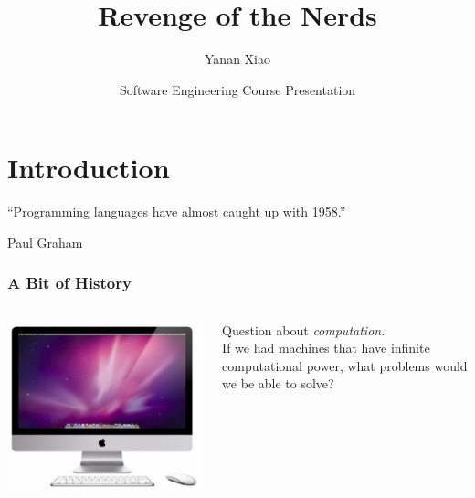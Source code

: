 \documentclass[12pt,hyperref=true,mathserif]{beamer}
\begin{document}
\title{Revenge of the Nerds}
\author{Yanan Xiao}
\date[CIS502 Presentation]{Software Engineering Course Presentation}

\begin{frame}
\titlepage
\end{frame}

\begin{frame}
  \tableofcontents
\end{frame}

\section{Introduction}


\begin{frame}
\begin{center}
``Programming languages have almost caught up with 1958.''
\end{center}
\hfill  Paul Graham  
\end{frame}

\begin{frame}
  \frametitle{A Bit of History}
  \begin{columns}
    \begin{column}{0.5\textwidth}
      \includegraphics[scale=0.3]{iMac-500}
    \end{column}
    \begin{column}{0.5\textwidth}
      Question about \emph{computation}.\\[4pt]
      If we had machines that have infinite computational power, what
      problems would we be able to solve?
    \end{column}
  \end{columns}
  
\end{frame}
\end{document}
